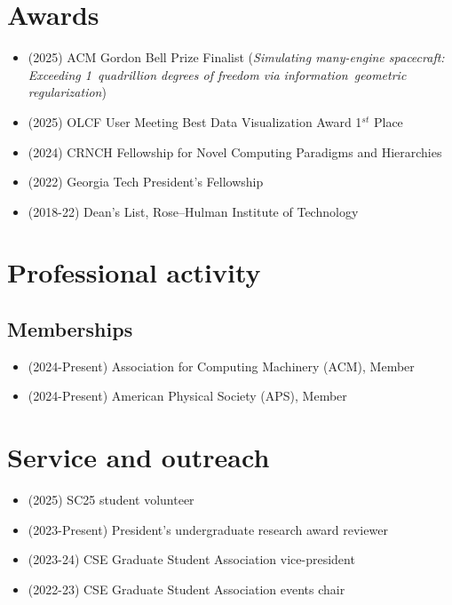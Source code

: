 \documentclass{article}
\begin{document}
\section{Awards}
\begin{itemize}
    \item[\faAward] (2025) ACM Gordon Bell Prize Finalist (\textit{Simulating many-engine spacecraft: Exceeding 1~quadrillion degrees of freedom via information~geometric regularization})
    \item[\faAward] (2025) OLCF User Meeting Best Data Visualization Award 1$^{st}$ Place
    \item[\faAward] (2024) CRNCH Fellowship for Novel Computing Paradigms and Hierarchies
    \item[\faAward] (2022) Georgia Tech President's Fellowship
    \item[\faAward] (2018-22) Dean's List, Rose--Hulman Institute of Technology
\end{itemize}

\section{Professional activity}

\subsection{Memberships}
\begin{itemize}
    \item[\faChevronRight] (2024-Present) Association for Computing Machinery (ACM), Member
    \item[\faChevronRight] (2024-Present) American Physical Society (APS), Member
\end{itemize}

\section{Service and outreach}
\begin{itemize}
    \item[\faChevronRight] (2025) SC25 student volunteer
    \item[\faChevronRight] (2023-Present) President's undergraduate research award reviewer
    \item[\faChevronRight] (2023-24) CSE Graduate Student Association vice-president
    \item[\faChevronRight] (2022-23) CSE Graduate Student Association events chair
\end{itemize}
\end{document}
